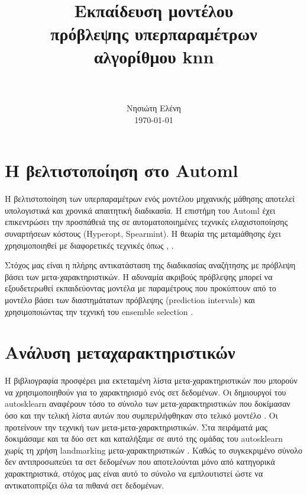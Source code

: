 \documentclass[]{article}
\title{
	\usefont{OT1}{bch}{b}{n}
	\normalfont \normalsize \textsc{} \\ 
	\horrule{0.5pt} \\[0.4cm]
	\huge  Εκπαίδευση μοντέλου \\πρόβλεψης υπερπαραμέτρων \\αλγορίθμου knn \\
	\horrule{2pt} \\[0.5cm]
}
\author{
	\normalfont 								\normalsize
	Νησιώτη Ελένη\\[-3pt]		\normalsize
	\today
}
\date{}
\numberwithin{equation}{section}		%
\numberwithin{figure}{section}			%
\numberwithin{table}{section}				%
\begin{document}
	\maketitle
    \section{Η βελτιστοποίηση στο Automl}
    Η βελτιστοποίηση των υπερπαραμέτρων ενός μοντέλου μηχανικής μάθησης αποτελεί υπολογιστικά και χρονικά απαιτητική διαδικασία. Η επιστήμη του Automl έχει επικεντρώσει την προσπάθειά της σε αυτοματοποιημένες τεχνικές ελαχιστοποίησης συναρτήσεων κόστους (Hyperopt, Spearmint). Η θεωρία της μεταμάθησης έχει χρησιμοποιηθεί με διαφορετικές τεχνικές όπως \citep{Feurer:2014:UMI:3015544.3015549}, \citep{Soares2004}.
    
    Στόχος μας είναι η πλήρης αντικατάσταση της διαδικασίας αναζήτησης με πρόβλεψη βάσει των μετα-χαρακτηριστικών. Η αδυναμία ακριβούς πρόβλεψης μπορεί να εξουδετερωθεί εκπαιδεύοντας μοντέλα με παραμέτρους που προκύπτουν από το μοντέλο βάσει των διαστημάτατων πρόβλεψης (prediction intervals) και χρησιμοποιώντας την τεχνική του ensemble selection \citep{Caruana:2004:ESL:1015330.1015432}.

    
    \section{Ανάλυση μεταχαρακτηριστικών}
    Η βιβλιογραφία προσφέρει μια εκτεταμένη λίστα μετα-χαρακτηριστικών που μπορούν να χρησιμοποιηθούν για το χαρακτηρισμό ενός σετ δεδομένων. Oι δημιουργοί του autosklearn αναφέρουν τόσο το σύνολο των μετα-χαρακτηριστικών που δοκίμασαν \citep{Feurer:2014:UMI:3015544.3015549} όσο και την τελική λίστα αυτών που συμπεριλήφθηκαν στο τελικό μοντέλο \citep{autosklearn}. Οι \citet{Reif_meta2-features:} προτείνουν την τεχνική των μετα-μετα-χαρακτηριστικών. Στα πειράματά μας δοκιμάσαμε και τα δύο σετ και καταλήξαμε σε αυτό της ομάδας του autosklearn χωρίς τη χρήση landmarking μετα-χαρακτηριστικών . Καθώς το συγκεκριμένο σύνολο δεν αντιπροσωπεύει τα σετ δεδομένων που αποτελούνται μόνο από κατηγορικά χαρακτηριστικά, στόχος μας είναι αυτό το σύνολο να εμπλουτιστεί ώστε να αντικατοπτρίζει όλα τα πιθανά σετ δεδομένων.
    
\end{document}
